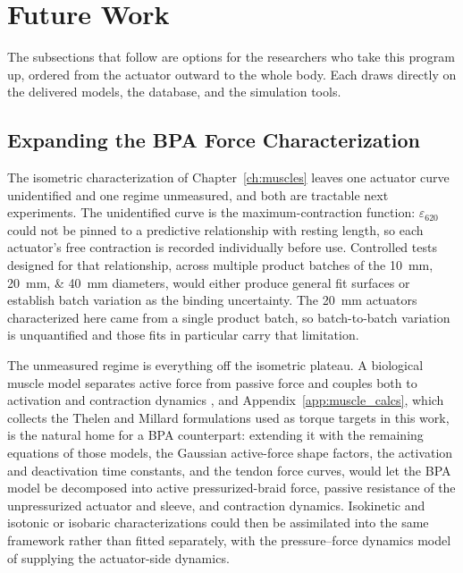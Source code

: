 \section{Future Work}

The subsections that follow are options for the researchers who take this program up, ordered from the actuator outward to the whole body. Each draws directly on the delivered models, the database, and the simulation tools.

\subsection{Expanding the BPA Force Characterization}\label{sec:fw_bpa}

The isometric characterization of Chapter~\ref{ch:muscles} leaves one actuator curve unidentified and one regime unmeasured, and both are tractable next experiments. The unidentified curve is the maximum-contraction function: $\varepsilon_{620}$ could not be pinned to a predictive relationship with resting length, so each actuator's free contraction is recorded individually before use. Controlled tests designed for that relationship, across multiple product batches of the \qtylist{10;20;40}{\mm} diameters, would either produce general fit surfaces or establish batch variation as the binding uncertainty. The \qty{20}{\mm} actuators characterized here came from a single product batch, so batch-to-batch variation is unquantified and those fits in particular carry that limitation.

The unmeasured regime is everything off the isometric plateau. A biological muscle model separates active force from passive force and couples both to activation and contraction dynamics \citep{thelen_adjustment_2003, millard_flexing_2013}, and Appendix~\ref{app:muscle_calcs}, which collects the Thelen and Millard formulations used as torque targets in this work, is the natural home for a BPA counterpart: extending it with the remaining equations of those models, the Gaussian active-force shape factors, the activation and deactivation time constants, and the tendon force curves, would let the BPA model be decomposed into active pressurized-braid force, passive resistance of the unpressurized actuator and sleeve, and contraction dynamics. Isokinetic and isotonic or isobaric characterizations could then be assimilated into the same framework rather than fitted separately, with the pressure--force dynamics model of \citet{elzein_pressure_2025} supplying the actuator-side dynamics.

